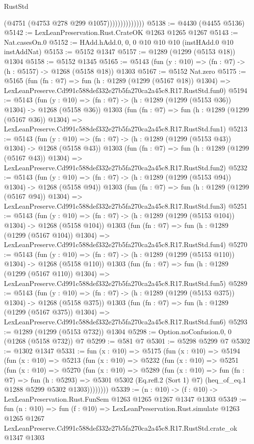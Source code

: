 \begin{lexlean}{RustStd}
\begin{coremodule}
                            (@4751 (@4753 @278 @299 @1057))))))))))))))
@5138 := @4430 (@4455 @5136)
@5142 := LexLeanPreservation.Rust.CrateOK @1263 @1265 @1267
@5143 := Nat.casesOn.{0}
@5152 := HAdd.hAdd.{0, 0, 0} @10 @10 @10 (instHAdd.{0} @10 instAddNat)
@5153 := @5152 @1347
@5157 := @1289 (@1299 (@5153 @18)) @1304
@5158 := @5152 @1345
@5165 := @5143 (fun (y : @10) => (fn : @7) -> (h : @5157) -> @1268 (@5158 @18)) @1303
@5167 := @5152 Nat.zero
@5175 := @5165
    (fun (fn : @7) =>
    fun (h : @1289 (@1299 (@5167 @18)) @1304) =>
    LexLeanPreserve.Cd991c588def332e27b5fa270ca2a45c8.R17.RustStd.fun0)
@5194 := @5143
    (fun (y : @10) => (fn : @7) -> (h : @1289 (@1299 (@5153 @36)) @1304) -> @1268 (@5158 @36))
    @1303
    (fun (fn : @7) =>
    fun (h : @1289 (@1299 (@5167 @36)) @1304) =>
    LexLeanPreserve.Cd991c588def332e27b5fa270ca2a45c8.R17.RustStd.fun1)
@5213 := @5143
    (fun (y : @10) => (fn : @7) -> (h : @1289 (@1299 (@5153 @43)) @1304) -> @1268 (@5158 @43))
    @1303
    (fun (fn : @7) =>
    fun (h : @1289 (@1299 (@5167 @43)) @1304) =>
    LexLeanPreserve.Cd991c588def332e27b5fa270ca2a45c8.R17.RustStd.fun2)
@5232 := @5143
    (fun (y : @10) => (fn : @7) -> (h : @1289 (@1299 (@5153 @94)) @1304) -> @1268 (@5158 @94))
    @1303
    (fun (fn : @7) =>
    fun (h : @1289 (@1299 (@5167 @94)) @1304) =>
    LexLeanPreserve.Cd991c588def332e27b5fa270ca2a45c8.R17.RustStd.fun3)
@5251 := @5143
    (fun (y : @10) => (fn : @7) -> (h : @1289 (@1299 (@5153 @104)) @1304) -> @1268 (@5158 @104))
    @1303
    (fun (fn : @7) =>
    fun (h : @1289 (@1299 (@5167 @104)) @1304) =>
    LexLeanPreserve.Cd991c588def332e27b5fa270ca2a45c8.R17.RustStd.fun4)
@5270 := @5143
    (fun (y : @10) => (fn : @7) -> (h : @1289 (@1299 (@5153 @110)) @1304) -> @1268 (@5158 @110))
    @1303
    (fun (fn : @7) =>
    fun (h : @1289 (@1299 (@5167 @110)) @1304) =>
    LexLeanPreserve.Cd991c588def332e27b5fa270ca2a45c8.R17.RustStd.fun5)
@5289 := @5143
    (fun (y : @10) => (fn : @7) -> (h : @1289 (@1299 (@5153 @375)) @1304) -> @1268 (@5158 @375))
    @1303
    (fun (fn : @7) =>
    fun (h : @1289 (@1299 (@5167 @375)) @1304) =>
    LexLeanPreserve.Cd991c588def332e27b5fa270ca2a45c8.R17.RustStd.fun6)
@5293 := @1289 (@1299 (@5153 @732)) @1304
@5298 := Option.noConfusion.{0, 0} (@1268 (@5158 @732)) @7
@5299 := @581 @7
@5301 := @5298 @5299 @7
@5302 := @1302 @1347
@5331 := fun (x : @10) =>
  @5175
    (fun (x : @10) =>
    @5194
      (fun (x : @10) =>
      @5213
        (fun (x : @10) =>
        @5232
          (fun (x : @10) =>
          @5251
            (fun (x : @10) =>
            @5270
              (fun (x : @10) =>
              @5289
                (fun (x : @10) =>
                fun (fn : @7) =>
                fun (h : @5293) =>
                @5301 @5302 (Eq.refl.{2} (Sort 1) @7) (heq_of_eq.{1} @1288 @5299 @5302 @1303))))))))
@5339 := (n : @10) -> (f : @10) -> LexLeanPreservation.Rust.FunSem @1263 @1265 @1267 @1347 @1303
@5349 := fun (n : @10) =>
  fun (f : @10) =>
  LexLeanPreservation.Rust.simulate
    @1263
    @1265
    @1267
    LexLeanPreserve.Cd991c588def332e27b5fa270ca2a45c8.R17.RustStd.crate_ok
    @1347
    @1303
\end{coremodule}
\end{lexlean}
